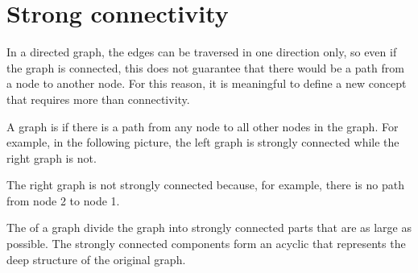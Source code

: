 \chapter{Strong connectivity}


In a directed graph,
the edges can be traversed in one direction only,
so even if the graph is connected,
this does not guarantee that there would be
a path from a node to another node.
For this reason, it is meaningful to define a new concept
that requires more than connectivity.

A graph is 
if there is a path from any node to all
other nodes in the graph.
For example, in the following picture,
the left graph is strongly connected
while the right graph is not.

\begin{center}
\end{center}

The right graph is not strongly connected
because, for example, there is no path
from node 2 to node 1.


The 
of a graph divide the graph into strongly connected
parts that are as large as possible.
The strongly connected components form an
acyclic  that represents
the deep structure of the original graph.

